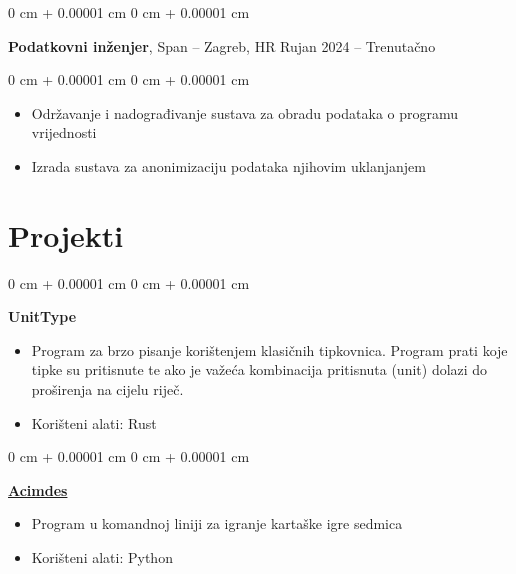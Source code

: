 \documentclass[10pt, letterpaper]{article}
\newenvironment{highlights}{
    \begin{itemize}[
        topsep=0.10 cm,
        parsep=0.10 cm,
        partopsep=0pt,
        itemsep=0pt,
        leftmargin=0 cm + 10pt
    ]
}{
    \end{itemize}
} %
\newenvironment{onecolentry}{
    \begin{adjustwidth}{
        0 cm + 0.00001 cm
    }{
        0 cm + 0.00001 cm
    }
}{
    \end{adjustwidth}
} %
\newenvironment{twocolentry}[2][]{
    \onecolentry
    \def\secondColumn{#2}
    \setcolumnwidth{\fill, 4.5 cm}
    \begin{paracol}{2}
}{
    \switchcolumn \raggedleft \secondColumn
    \end{paracol}
    \endonecolentry
} %
\begin{document}
        \vspace{0.2 cm}

        \begin{twocolentry}{
            Rujan 2024 – Trenutačno
        }
            \textbf{Podatkovni inženjer}, Span -- Zagreb, HR\end{twocolentry}

        \vspace{0.10 cm}
        \begin{onecolentry}
            \begin{highlights}
                \item Održavanje i nadograđivanje sustava za obradu podataka o programu vrijednosti
                \item Izrada sustava za anonimizaciju podataka njihovim uklanjanjem
            \end{highlights}
        \end{onecolentry}


    \section{Projekti}

        \begin{onecolentry}
            \textbf{UnitType}
            \vspace{0.10 cm}
            \begin{highlights}
                \item Program za brzo pisanje korištenjem klasičnih tipkovnica. Program prati koje tipke su pritisnute te ako je važeća kombinacija pritisnuta (unit) dolazi do proširenja na cijelu riječ.
                \item Korišteni alati: Rust
            \end{highlights}
        \end{onecolentry}


        \vspace{0.2 cm}

        \begin{onecolentry}
            \href{https://github.com/IvanDerdicDer/Acimdes}{\textbf{Acimdes}}
            \vspace{0.10 cm}
            \begin{highlights}
                \item Program u komandnoj liniji za igranje kartaške igre sedmica
                \item Korišteni alati: Python
            \end{highlights}
        \end{onecolentry}
\end{document}
